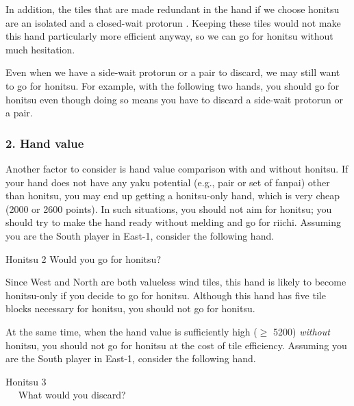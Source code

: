 \bigskip
In addition, the tiles that are made redundant in the hand if we choose {\jap honitsu} are an isolated {\LARGE{}} and a closed-wait protorun {\LARGE{}}. Keeping these tiles would not make this hand particularly more efficient anyway, so we can go for {\jap honitsu} without much hesitation.

\bigskip
Even when we have a side-wait protorun or a pair to discard, we may still want to go for {\jap honitsu}. For example, with the following two hands, you should go for {\jap honitsu} even though doing so means you have to discard a side-wait protorun or a pair.
\bp
{}\xi\bai\bai\bai\\
\dong\nan\nan\bei\zhong
\ep

\subsubsection{2. Hand value}

Another factor to consider is hand value comparison with and without {\jap honitsu}. If your hand does not have any {\jap yaku} potential (e.g., pair or set of {\jap fanpai}) other than {\jap honitsu}, you may end up getting a {\jap honitsu}-only hand, which is very cheap (2000 or 2600 points). In such situations, you should not aim for {\jap honitsu}; you should try to make the hand ready without melding and go for riichi. Assuming you are the South player in East-1, consider the following hand.
\begin{itembox}[r]{{\jap Honitsu} 2}
\bp
{}\xi\xi\bei\bei
\ep
\vspace{-10pt}Would you go for {\jap honitsu}? \vspace{-5pt}
\end{itembox}
\noindent
Since West and North are both valueless wind tiles, this hand is likely to become {\jap honitsu}-only if you decide to go for {\jap honitsu}. Although this hand has five tile blocks necessary for {\jap honitsu}, you should not go for {\jap honitsu}.

\bigskip
At the same time, when the hand value is sufficiently high ($\geq$ 5200) \emph{without} {\jap honitsu}, you should not go for {\jap honitsu} at the cost of tile efficiency. Assuming you are the South player in East-1, consider the following hand.
\begin{itembox}[r]{{\jap Honitsu} 3}
\bp \vspace{-10pt}
\\ \vspace{-16pt}
\rfw{}\fa\fa\fa\xi~~\nan\nan\rnan
\ep
\vspace{-10pt}What would you discard? \vspace{-5pt}
\end{itembox}

